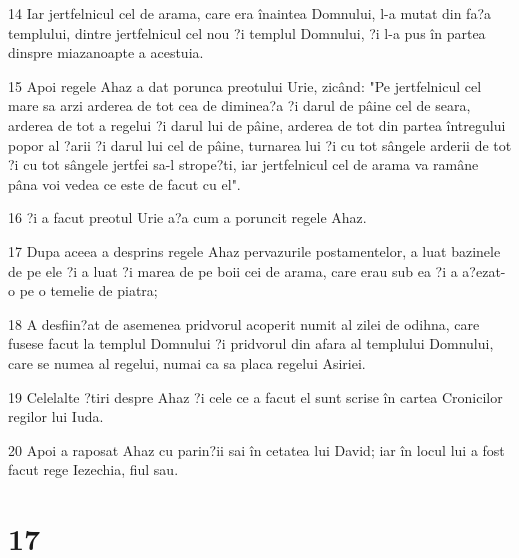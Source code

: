 \par 14 Iar jertfelnicul cel de arama, care era înaintea Domnului, l-a mutat din fa?a templului, dintre jertfelnicul cel nou ?i templul Domnului, ?i l-a pus în partea dinspre miazanoapte a acestuia.
\par 15 Apoi regele Ahaz a dat porunca preotului Urie, zicând: "Pe jertfelnicul cel mare sa arzi arderea de tot cea de diminea?a ?i darul de pâine cel de seara, arderea de tot a regelui ?i darul lui de pâine, arderea de tot din partea întregului popor al ?arii ?i darul lui cel de pâine, turnarea lui ?i cu tot sângele arderii de tot ?i cu tot sângele jertfei sa-l strope?ti, iar jertfelnicul cel de arama va ramâne pâna voi vedea ce este de facut cu el".
\par 16 ?i a facut preotul Urie a?a cum a poruncit regele Ahaz.
\par 17 Dupa aceea a desprins regele Ahaz pervazurile postamentelor, a luat bazinele de pe ele ?i a luat ?i marea de pe boii cei de arama, care erau sub ea ?i a a?ezat-o pe o temelie de piatra;
\par 18 A desfiin?at de asemenea pridvorul acoperit numit al zilei de odihna, care fusese facut la templul Domnului ?i pridvorul din afara al templului Domnului, care se numea al regelui, numai ca sa placa regelui Asiriei.
\par 19 Celelalte ?tiri despre Ahaz ?i cele ce a facut el sunt scrise în cartea Cronicilor regilor lui Iuda.
\par 20 Apoi a raposat Ahaz cu parin?ii sai în cetatea lui David; iar în locul lui a fost facut rege Iezechia, fiul sau.

\chapter{17}

